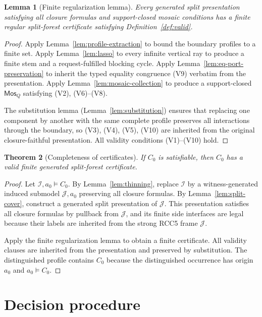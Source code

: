 \documentclass[11pt]{article}
\newtheorem{theorem}{Theorem}[section]
\newtheorem{lemma}[theorem]{Lemma}
\newcommand{\I}{\mathcal I}
\newcommand{\J}{\mathcal J}
\newcommand{\Mos}{\mathsf{Mos}}
\begin{document}
\begin{lemma}[Finite regularization lemma]\label{lem:regularization}
Every generated split presentation satisfying all closure formulas
and support-closed mosaic conditions has a finite regular
split-forest certificate satisfying Definition~\ref{def:valid}.
\end{lemma}

\begin{proof}
Apply Lemma~\ref{lem:profile-extraction} to bound the boundary
profiles to a finite set.  Apply Lemma~\ref{lem:lasso} to every
infinite vertical ray to produce a finite stem and a
request-fulfilled blocking cycle.  Apply
Lemma~\ref{lem:eq-port-preservation} to inherit the typed equality
congruence (V9) verbatim from the presentation.  Apply
Lemma~\ref{lem:mosaic-collection} to produce a support-closed
$\Mos_Q$ satisfying (V2), (V6)--(V8).

The substitution lemma (Lemma~\ref{lem:substitution}) ensures that
replacing one component by another with the same complete profile
preserves all interactions through the boundary, so (V3), (V4),
(V5), (V10) are inherited from the original closure-faithful
presentation.  All validity conditions (V1)--(V10) hold.
\end{proof}

\begin{theorem}[Completeness of certificates]\label{thm:completeness}
If $C_0$ is satisfiable, then $C_0$ has a valid finite generated split-forest certificate.
\end{theorem}

\begin{proof}
Let $\I,a_0\models C_0$.  By Lemma~\ref{lem:thinning}, replace $\I$ by a witness-generated induced submodel $\J,a_0$ preserving all closure formulas.  By Lemma~\ref{lem:split-cover}, construct a generated split presentation of $\J$.  This presentation satisfies all closure formulas by pullback from $\J$, and its finite side interfaces are legal because their labels are inherited from the strong RCC5 frame $\J$.

Apply the finite regularization lemma to obtain a finite certificate.  All validity clauses are inherited from the presentation and preserved by substitution.  The distinguished profile contains $C_0$ because the distinguished occurrence has origin $a_0$ and $a_0\models C_0$.
\end{proof}

\section{Decision procedure}
\end{document}
